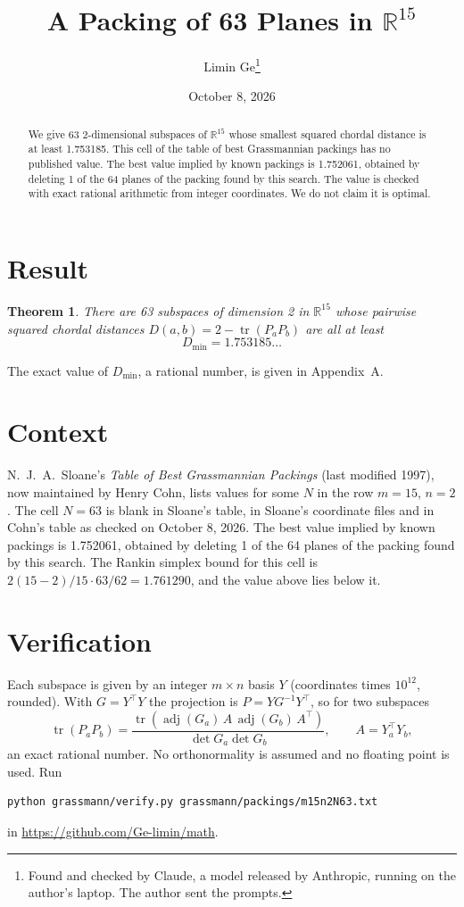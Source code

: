 \documentclass[11pt,a4paper]{article}
\title{A Packing of 63 Planes in $\mathbb{R}^{15}$}
\author{Limin Ge\thanks{Found and checked by Claude, a model released by Anthropic, running on the author's laptop. The author sent the prompts.}}
\date{October 8, 2026}
\newtheorem*{theorem}{Theorem}
\begin{document}
\maketitle
\begin{abstract}
We give 63 2-dimensional subspaces of $\mathbb{R}^{15}$ whose smallest squared chordal distance is at least 1.753185. This cell of the table of best Grassmannian packings has no published value. The best value implied by known packings is 1.752061, obtained by deleting 1 of the 64 planes of the packing found by this search. The value is checked with exact rational arithmetic from integer coordinates. We do not claim it is optimal.
\end{abstract}

\section{Result}
\begin{theorem}
There are 63 subspaces of dimension 2 in $\mathbb{R}^{15}$ whose pairwise squared chordal distances $D(a,b) = 2 - \operatorname{tr}(P_aP_b)$ are all at least
\[ D_{\min} = 1.753185\ldots \]
\end{theorem}
The exact value of $D_{\min}$, a rational number, is given in Appendix~A.


\section{Context}
N.~J.~A.~Sloane's \emph{Table of Best Grassmannian Packings} (last modified 1997), now maintained by Henry Cohn, lists values for some $N$ in the row $m=15$, $n=2$. The cell $N=63$ is blank in Sloane's table, in Sloane's coordinate files and in Cohn's table as checked on October 8, 2026. The best value implied by known packings is 1.752061, obtained by deleting 1 of the 64 planes of the packing found by this search. The Rankin simplex bound for this cell is $2(15-2)/15\cdot 63/62 = 1.761290$, and the value above lies below it.


\section{Verification}
Each subspace is given by an integer $m\times n$ basis $Y$ (coordinates times $10^{12}$, rounded). With $G=Y^\top Y$ the projection is $P=YG^{-1}Y^\top$, so for two subspaces
\[ \operatorname{tr}(P_aP_b)=\frac{\operatorname{tr}(\operatorname{adj}(G_a)\,A\,\operatorname{adj}(G_b)\,A^\top)}{\det G_a\det G_b},\qquad A=Y_a^\top Y_b, \]
an exact rational number. No orthonormality is assumed and no floating point is used. Run
\begin{verbatim}
python grassmann/verify.py grassmann/packings/m15n2N63.txt
\end{verbatim}
in \url{https://github.com/Ge-limin/math}.
\end{document}
